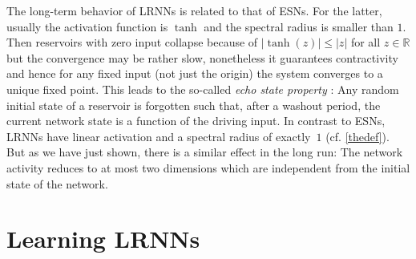 \documentclass[preprint,12pt,times,authoryear]{elsarticle}%
\theoremstyle{definition}
\begin{document}
The long-term behavior of LRNNs is related to that of ESNs. For the latter,
usually the activation function is $\tanh$ and the spectral radius is smaller
than $1$. Then reservoirs with zero input collapse because of $|\!\tanh(z)| \le
|z|$ for all $z \in \mathbb{R}$ but the convergence may be rather slow,
nonetheless it guarantees contractivity and hence for any fixed input (not just
the origin) the system converges to a unique fixed point. This leads
to the so-called \emph{echo state property} \citep{MJ13}: Any random initial
state of a reservoir is forgotten such that, after a washout period, the current
network state is a function of the driving input. In contrast to ESNs, LRNNs
have linear activation and a spectral radius of exactly~$1$ (cf. \cref{thedef}).
But as we have just shown, there is a similar effect in the long run: The
network activity reduces to at most two dimensions which are independent from
the initial state of the network.

\section{Learning LRNNs}\label{learn}
\end{document}
